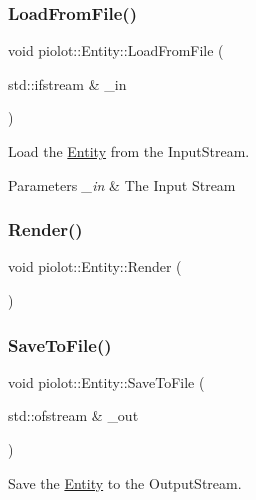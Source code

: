 \subsubsection{\texorpdfstring{Load\+From\+File()}{LoadFromFile()}}
{\footnotesize\ttfamily void piolot\+::\+Entity\+::\+Load\+From\+File (\begin{DoxyParamCaption}\item[{std\+::ifstream \&}]{\+\_\+in }\end{DoxyParamCaption})}



Load the \mbox{\hyperlink{classpiolot_1_1_entity}{Entity}} from the Input\+Stream. 


\begin{DoxyParams}{Parameters}
{\em \+\_\+in} & The Input Stream \\
\hline
\end{DoxyParams}
\mbox{\label{classpiolot_1_1_entity_a9b7f0caf16313208ca115504a2453a12}} 
\subsubsection{\texorpdfstring{Render()}{Render()}}
{\footnotesize\ttfamily void piolot\+::\+Entity\+::\+Render (\begin{DoxyParamCaption}{ }\end{DoxyParamCaption})}

\mbox{\label{classpiolot_1_1_entity_aefccda157de60277a141d865982a089b}} 
\subsubsection{\texorpdfstring{Save\+To\+File()}{SaveToFile()}}
{\footnotesize\ttfamily void piolot\+::\+Entity\+::\+Save\+To\+File (\begin{DoxyParamCaption}\item[{std\+::ofstream \&}]{\+\_\+out }\end{DoxyParamCaption})}



Save the \mbox{\hyperlink{classpiolot_1_1_entity}{Entity}} to the Output\+Stream. 


